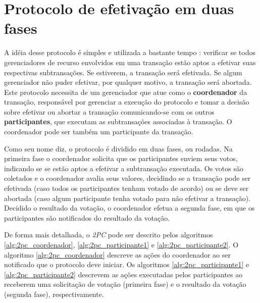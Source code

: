\documentclass[11pt,twoside,a4paper]{book}
\begin{document}
\section{Protocolo de efetivação em duas fases}
\label{sec:2pc}
A idéia desse protocolo é simples e utilizada a bastante tempo \cite{2pc}: verificar se todos gerenciadores de recurso envolvidos em uma transação estão aptos a efetivar suas respectivas subtransações. Se estiverem, a transação será efetivada. Se algum gerenciador não puder efetivar, por qualquer motivo, a transação será abortada. Este protocolo necessita de um gerenciador que atue como o \textbf{coordenador} da transação, responsável por gerenciar a execução do protocolo e tomar a decisão sobre efetivar ou abortar a transação comunicando-se com os outros \textbf{participantes}, que executam as subtransações associadas à transação. O coordenador pode ser também um participante da transação.

Como seu nome diz, o protocolo é dividido em duas fases, ou rodadas. Na primeira fase o coordenador solicita que os participantes enviem seus votos, indicando se se estão aptos a efetivar a subtransação executada. Os votos são coletados e o coordenador avalia seus valores, decidindo se a transação pode ser efetivada (caso todos os participantes tenham votado de acordo) ou se deve ser abortada (caso algum participante tenha votado para não efetivar a transação). Decidido o resultado da votação, o coordenador efetua a segunda fase, em que os participantes são notificados do resultado da votação. 


De forma mais detalhada, o \emph{2PC} pode ser descrito pelos algoritmos \ref{alg:2pc_coordenador}, \ref{alg:2pc_participante1} e \ref{alg:2pc_participante2}. O algoritmo \ref{alg:2pc_coordenador} descreve as ações do coordenador ao ser notificado que o protocolo deve iniciar. Os algoritmos \ref{alg:2pc_participante1} e \ref{alg:2pc_participante2} descrevem as ações executadas pelos participantes ao receberem uma solicitação de votação (primeira fase) e o resultado da votação (segunda fase), respectivamente. 
\end{document}
